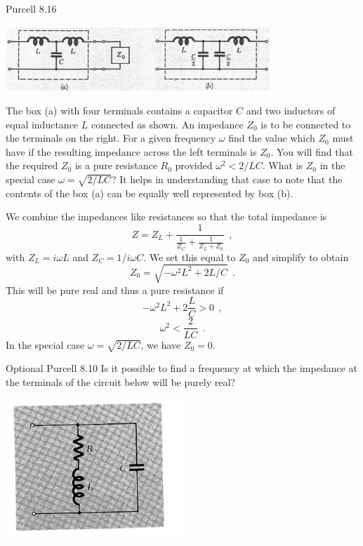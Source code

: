 \documentclass[makesolutionspdf]{esg8022pset}
\begin{document}
\begin{problem}{Purcell 8.16}
  \begin{center}
    \includegraphics[width = 0.75\textwidth]{pu816}
  \end{center}

  \noindent The box (a) with four terminals contains a capacitor $C$ and
  two inductors of equal inductance $L$ connected as shown.  An impedance
  $Z_0$ is to be connected to the terminals on the right. For a given
  frequency $\omega$ find the value which $Z_0$ must have if the resulting
  impedance across the left terminals is $Z_0$. You will find that the
  required $Z_0$ is a pure resistance $R_0$ provided $\omega^2<2/LC$. What
  is $Z_0$ in the special case $\omega = \sqrt{2/LC}$?  It helps in
  understanding that case to note that the contents of the box (a) can be
  equally well represented by box (b).
\end{problem}

\begin{solution}
  We combine the impedances like resistances so that the total impedance is
  \[ Z = Z_L + \frac{1}{\frac{1}{Z_C} + \frac{1}{Z_L + Z_0}}\ \ , \]
  with $Z_L = i\omega L$ and $Z_C = 1/i\omega C$. We set this equal to $Z_0$ and simplify to obtain
  \[ Z_0 = \sqrt{-\omega^2L^2 + 2L/C}\ \ .\]
  This will be pure real and thus a pure resistance if
  \[ -\omega^2L^2 + 2\frac{L}{C} >0 \ \ ,\]
  \[ \omega^2 < \frac{2}{LC}\ \ .\]
  In the special case $\omega = \sqrt{2/LC}$, we have $Z_0=0$. 
\end{solution}

\begin{problem}{Optional Purcell 8.10}
  Is it possible to find a frequency at which the impedance at the
  terminals of the circuit below will be purely real?
  
  \begin{center}
    \includegraphics[width = 0.5\textwidth]{figpu810}
  \end{center}
\end{problem}
\end{document}
